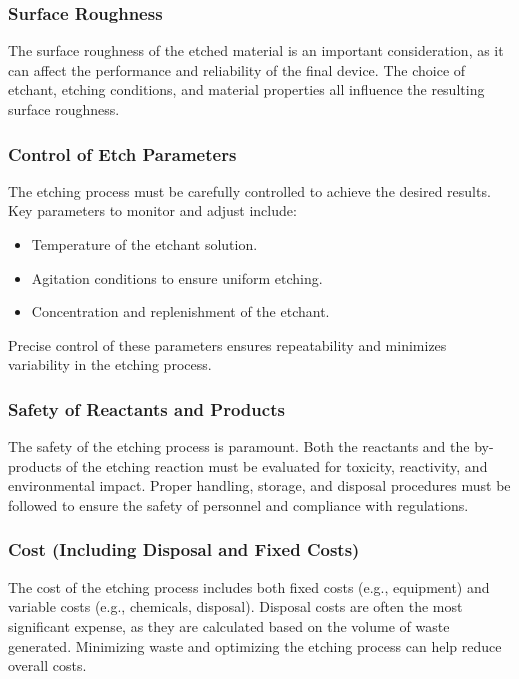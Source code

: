 \documentclass{report}
\begin{document}
\subsubsection{Surface Roughness}
The surface roughness of the etched material is an important consideration, as it can affect the performance and reliability of the final device. The choice of etchant, etching conditions, and material properties all influence the resulting surface roughness.

\subsubsection{Control of Etch Parameters}
The etching process must be carefully controlled to achieve the desired results. Key parameters to monitor and adjust include:
\begin{itemize}
    \item Temperature of the etchant solution.
    \item Agitation conditions to ensure uniform etching.
    \item Concentration and replenishment of the etchant.
\end{itemize}
Precise control of these parameters ensures repeatability and minimizes variability in the etching process.

\subsubsection{Safety of Reactants and Products}
The safety of the etching process is paramount. Both the reactants and the by-products of the etching reaction must be evaluated for toxicity, reactivity, and environmental impact. Proper handling, storage, and disposal procedures must be followed to ensure the safety of personnel and compliance with regulations.

\subsubsection{Cost (Including Disposal and Fixed Costs)}
The cost of the etching process includes both fixed costs (e.g., equipment) and variable costs (e.g., chemicals, disposal). Disposal costs are often the most significant expense, as they are calculated based on the volume of waste generated. Minimizing waste and optimizing the etching process can help reduce overall costs.
\end{document}
